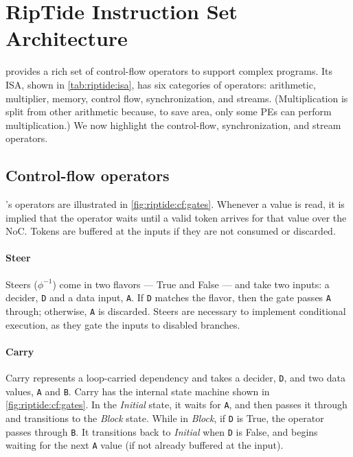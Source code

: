 \section{RipTide Instruction Set Architecture}
\label{riptide:cf}



\figRipTideISA

\riptide provides a rich set of control-flow operators to support complex programs.
% 
Its ISA, shown in \autoref{tab:riptide:isa}, has six categories of operators: arithmetic, multiplier, memory, control flow, synchronization, and streams.
%
(Multiplication is split from other arithmetic because, to save area, only some PEs can perform multiplication.)
%
We now highlight the control-flow, synchronization, and stream operators.

\subsection{Control-flow operators}
%
\riptide's operators are illustrated in \autoref{fig:riptide:cf:gates}.
%
Whenever a value is read, it is implied that the
operator waits until a valid token arrives for that value over the
NoC. Tokens are buffered at the inputs if they are not
consumed or discarded.

\figRipTideCFGates

\figRipTideCompiler

\paragraph{Steer} 
Steers ($\phi^{-1}$) come in two flavors --- True and False --- and take two inputs: a decider, {\tt D} and a data input, {\tt A}.
% 
If {\tt D} matches the flavor, then the gate passes {\tt A} through; otherwise, {\tt A} is discarded.
% 
Steers are necessary to implement conditional execution, as they gate the inputs to disabled branches.

\paragraph{Carry}
\label{cf:carry}
% 
Carry represents a loop-carried dependency and takes a decider, {\tt D}, and two data values, {\tt A} and {\tt B}.
% 
Carry has the internal state machine shown in \autoref{fig:riptide:cf:gates}.
%
In the {\em Initial} state, it waits for {\tt A}, and then passes it through and transitions to the {\em Block} state.
%
While in {\em Block}, if {\tt D} is True, the operator passes through {\tt B}.
%
It transitions back to {\em Initial} when {\tt D} is False, and begins waiting for the next {\tt A} value (if not already buffered at the input).

